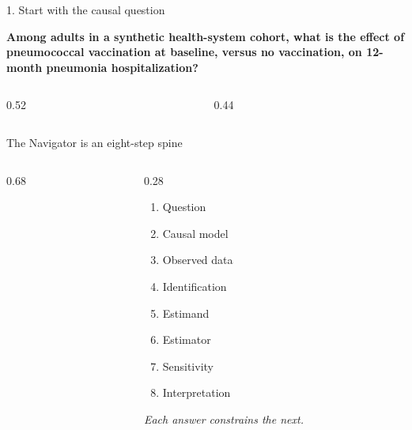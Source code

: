 \documentclass[aspectratio=169]{beamer}
\begin{document}
\begin{frame}{1. Start with the causal question}
  \begin{center}
    {\Large\bfseries
      Among adults in a synthetic health-system cohort, what is the effect of
      pneumococcal vaccination at baseline, versus no vaccination, on
      12-month pneumonia hospitalization?}
  \end{center}

  \vspace{0.25cm}
  \begin{columns}[T,onlytextwidth]
    \begin{column}{0.52\textwidth}
    \end{column}
    \begin{column}{0.44\textwidth}
    \end{column}
  \end{columns}

  \vspace{0.2cm}
  \syntheticnote
\end{frame}

\begin{frame}{The Navigator is an eight-step spine}
  \begin{columns}[T,onlytextwidth]
    \begin{column}{0.68\textwidth}
      \centering
    \end{column}
    \begin{column}{0.28\textwidth}
      \footnotesize
      \begin{enumerate}
        \item Question
        \item Causal model
        \item Observed data
        \item Identification
        \item Estimand
        \item Estimator
        \item Sensitivity
        \item Interpretation
      \end{enumerate}
      \vspace{0.1cm}
      {\scriptsize\itshape\color{black!55}
        Each answer constrains the next.}
    \end{column}
  \end{columns}
\end{frame}
\end{document}
